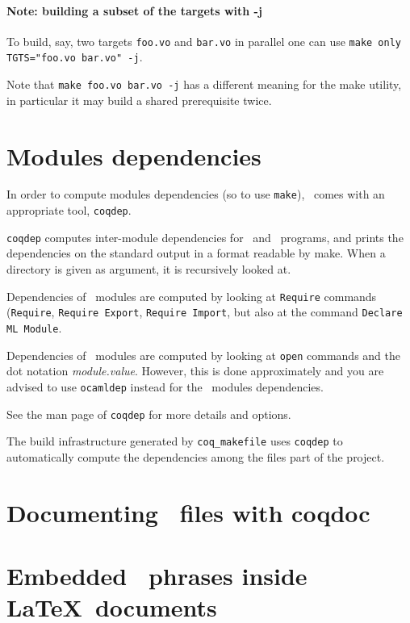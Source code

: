 \paragraph{Note: building a subset of the targets with -j}

To build, say, two targets \texttt{foo.vo} and \texttt{bar.vo}
in parallel one can use \texttt{make only TGTS="foo.vo bar.vo" -j}.

Note that \texttt{make foo.vo bar.vo -j} has a different meaning for
the make utility, in particular it may build a shared prerequisite twice.

\section[Modules dependencies]{Modules dependencies\label{Dependencies}
  }

In order to compute modules dependencies (so to use {\tt make}),
\Coq\ comes with an appropriate tool, {\tt coqdep}.

{\tt coqdep} computes inter-module dependencies for \Coq\ and
\ocaml\ programs, and prints the dependencies on the standard
output in a format readable by make.  When a directory is given as
argument, it is recursively looked at.

Dependencies of \Coq\ modules are computed by looking at {\tt Require}
commands ({\tt Require}, {\tt Requi\-re Export}, {\tt Require Import},
but also at the command {\tt Declare ML Module}.

Dependencies of \ocaml\ modules are computed by looking at
\verb!open! commands and the dot notation {\em module.value}. However,
this is done approximately and you are advised to use {\tt ocamldep}
instead for the \ocaml\ modules dependencies.

See the man page of {\tt coqdep} for more details and options.

The build infrastructure generated by {\tt coq\_makefile}
uses {\tt coqdep} to automatically compute the dependencies
among the files part of the project.

\section[Documenting \Coq\ files with coqdoc]{Documenting \Coq\ files with coqdoc\label{coqdoc}
}



\section[Embedded \Coq\ phrases inside \LaTeX\ documents]{Embedded \Coq\ phrases inside \LaTeX\ documents\label{Latex}
  }

